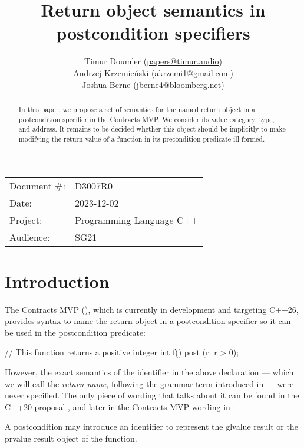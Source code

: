 


\title{Return object semantics in postcondition specifiers}
\author{ Timur Doumler \small(\href{mailto:papers@timur.audio}{papers@timur.audio}) \\
Andrzej Krzemie\' nski \small(\href{mailto:akrzemi1@gmail.com}{akrzemi1@gmail.com}) \\
Joshua Berne \small(\href{jberne4@bloomberg.net}{jberne4@bloomberg.net})
}
\date{}
\maketitle

\begin{tabular}{ll}
Document \#: & D3007R0 \\
Date: &2023-12-02 \\
Project: & Programming Language C++ \\
Audience: & SG21
\end{tabular}

\begin{abstract}
In this paper, we propose a set of semantics for the named return object in a postcondition specifier in the Contracts MVP. We consider its value category, type, and address. It remains to be decided whether this object should be implicitly  to make modifying the return value of a function in its precondition predicate ill-formed.
\end{abstract}

\section{Introduction}
\label{sec:intro}

The Contracts MVP (\cite{P2900R2}), which is currently in development and targeting C++26, provides syntax to name the return object in a postcondition specifier so it can be used in the postcondition predicate:
\begin{codeblock}
// This function returns a positive integer
int f()
  post (r: r > 0);
\end{codeblock}
However, the exact semantics of the identifier  in the above declaration --- which we will call the \emph{return-name}, following the grammar term introduced in \cite{P2932R2} --- were never specified. The only piece of wording that talks about it can be found in the C++20 proposal \cite{P0542R5}, and later in the Contracts MVP wording in \cite{P2388R4}:

\begin{adjustwidth}{0.5cm}{0.5cm}
A postcondition may introduce an identifier to represent the glvalue result or the prvalue result object of the function.
\end{adjustwidth}

